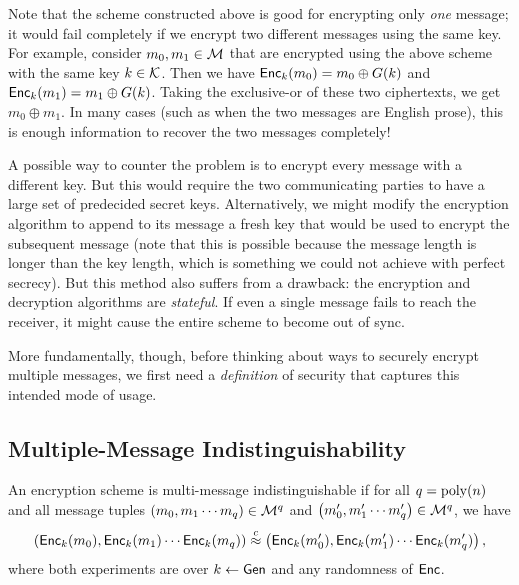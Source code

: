 \documentclass[11pt]{article}
\begin{document}
Note that the scheme constructed above is good for encrypting only
\emph{one} message; it would fail completely if we encrypt two
different messages using the same key.  For example, consider $m_0,
m_1 \in \mathcal{M}$ that are encrypted using the above scheme with the
same key $k \in \mathcal{K}$.  Then we have $\mathsf{Enc}_k(m_0) = m_0 \oplus
G(k)$ and $\mathsf{Enc}_k(m_1) = m_1 \oplus G(k)$.  Taking the exclusive-or
of these two ciphertexts, we get $m_0 \oplus m_1$.  In many cases
(such as when the two messages are English prose), this is enough
information to recover the two messages completely!

A possible way to counter the problem is to encrypt every message with
a different key.  But this would require the two communicating parties
to have a large set of predecided secret keys.  Alternatively, we
might modify the encryption algorithm to append to its message a fresh
key that would be used to encrypt the subsequent message (note that
this is possible because the message length is longer than the key
length, which is something we could not achieve with perfect secrecy).
But this method also suffers from a drawback: the encryption and
decryption algorithms are \emph{stateful}.  If even a single message
fails to reach the receiver, it might cause the entire scheme to
become out of sync.

More fundamentally, though, before thinking about ways to securely
encrypt multiple messages, we first need a \emph{definition} of
security that captures this intended mode of usage.

\subsection{Multiple-Message Indistinguishability}
\label{sec:mult-mess-indist}

\begin{definition}
  \label{def:multi-msg-indist}
  An encryption scheme is multi-message indistinguishable if for all
  $q=\operatorname{poly}(n)$ and all message tuples $\left( m_0, m_1 \cdots m_q
  \right) \in \mathcal{M}^q$ and $\left( m'_0, m'_1 \cdots m'_q \right)
  \in \mathcal{M}^q$, we have
  \[ \left( \mathsf{Enc}_k(m_0), \mathsf{Enc}_k(m_1) \cdots \mathsf{Enc}_k(m_q)
  \right) \stackrel{c}{\approx} \left( \mathsf{Enc}_k(m'_0), \mathsf{Enc}_k(m'_1) \cdots
    \mathsf{Enc}_k(m'_q) \right), \] where both experiments are over $k
  \gets \mathsf{Gen}$ and any randomness of $\mathsf{Enc}$.
\end{definition}
\end{document}
